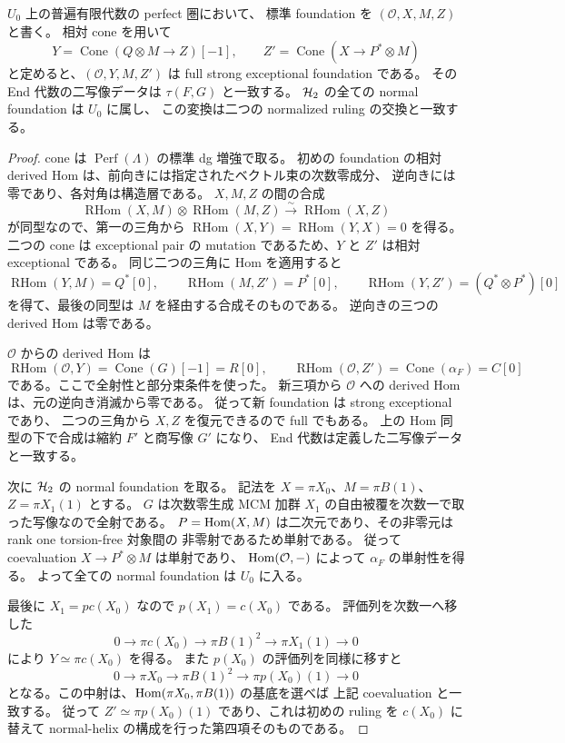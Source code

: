\begin{proposition}
\label{prop:ruling-involution-mutation}
$U_0$ 上の普遍有限代数の perfect 圏において、
標準 foundation を $(\mathcal O,X,M,Z)$ と書く。
相対 cone を用いて
\[
 Y=\operatorname{Cone}(Q\otimes M\longrightarrow Z)[-1],
 \qquad
 Z'=\operatorname{Cone}(X\longrightarrow P^*\otimes M)
\]
と定めると、$(\mathcal O,Y,M,Z')$ は full strong exceptional foundation である。
その End 代数の二写像データは $\tau(F,G)$ と一致する。
$\mathcal H_2$ の全ての normal foundation は $U_0$ に属し、
この変換は二つの normalized ruling の交換と一致する。
\end{proposition}

\begin{proof}
cone は $\operatorname{Perf}(\Lambda)$ の標準 dg 増強で取る。
初めの foundation の相対 derived Hom は、前向きには指定されたベクトル束の次数零成分、
逆向きには零であり、各対角は構造層である。
$X,M,Z$ の間の合成
\[
 \operatorname{RHom}(X,M)\otimes\operatorname{RHom}(M,Z)
 \xrightarrow\sim\operatorname{RHom}(X,Z)
\]
が同型なので、第一の三角から
$\operatorname{RHom}(X,Y)=\operatorname{RHom}(Y,X)=0$ を得る。
二つの cone は exceptional pair の mutation であるため、$Y$ と $Z'$ は相対 exceptional である。
同じ二つの三角に Hom を適用すると
\[
 \operatorname{RHom}(Y,M)=Q^*[0],\qquad
 \operatorname{RHom}(M,Z')=P^*[0],\qquad
 \operatorname{RHom}(Y,Z')=(Q^*\otimes P^*)[0]
\]
を得て、最後の同型は $M$ を経由する合成そのものである。
逆向きの三つの derived Hom は零である。

$\mathcal O$ からの derived Hom は
\[
 \operatorname{RHom}(\mathcal O,Y)
      =\operatorname{Cone}(G)[-1]=R[0],\qquad
 \operatorname{RHom}(\mathcal O,Z')
      =\operatorname{Cone}(\alpha_F)=C[0]
\]
である。ここで全射性と部分束条件を使った。
新三項から $\mathcal O$ への derived Hom は、元の逆向き消滅から零である。
従って新 foundation は strong exceptional であり、
二つの三角から $X,Z$ を復元できるので full でもある。
上の Hom 同型の下で合成は縮約 $F'$ と商写像 $G'$ になり、
End 代数は定義した二写像データと一致する。

次に $\mathcal H_2$ の normal foundation を取る。
記法を $X=\pi X_0$、$M=\pi B(1)$、$Z=\pi X_1(1)$ とする。
$G$ は次数零生成 MCM 加群 $X_1$ の自由被覆を次数一で取った写像なので全射である。
$P=\operatorname{Hom}(X,M)$ は二次元であり、その非零元は rank one torsion-free 対象間の
非零射であるため単射である。
従って coevaluation $X\to P^*\otimes M$ は単射であり、
$\operatorname{Hom}(\mathcal O,-)$ によって $\alpha_F$ の単射性を得る。
よって全ての normal foundation は $U_0$ に入る。

最後に $X_1=pc(X_0)$ なので $p(X_1)=c(X_0)$ である。
評価列を次数一へ移した
\[
 0\longrightarrow\pi c(X_0)
  \longrightarrow \pi B(1)^2
  \longrightarrow\pi X_1(1)\longrightarrow0
\]
により $Y\simeq\pi c(X_0)$ を得る。
また $p(X_0)$ の評価列を同様に移すと
\[
 0\longrightarrow\pi X_0
  \longrightarrow\pi B(1)^2
  \longrightarrow\pi p(X_0)(1)\longrightarrow0
\]
となる。この中射は、$\operatorname{Hom}(\pi X_0,\pi B(1))$ の基底を選べば
上記 coevaluation と一致する。
従って $Z'\simeq\pi p(X_0)(1)$ であり、これは初めの ruling を
$c(X_0)$ に替えて normal-helix の構成を行った第四項そのものである。
\end{proof}

